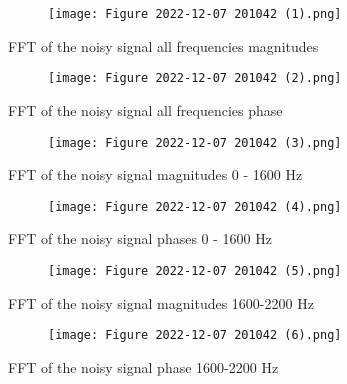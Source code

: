 \documentclass[12pt,a4paper]{article}
\begin{document}
\begin{figure}[h]
\centering
\begin{subfigure}{ 1\textwidth}
\texttt{[image: Figure 2022-12-07 201042 (1).png]}
\end{subfigure}
\caption{ FFT of the noisy signal all frequencies magnitudes }
\label{fig2:image22}
\end{figure}


\begin{figure}[h]
\centering
\begin{subfigure}{ 1\textwidth}
\texttt{[image: Figure 2022-12-07 201042 (2).png]}
\end{subfigure}
\caption{ FFT of the noisy signal all frequencies phase }
\label{fig2:image22}
\end{figure}

\begin{figure}[h]
\centering
\begin{subfigure}{ 1\textwidth}
\texttt{[image: Figure 2022-12-07 201042 (3).png]}
\end{subfigure}
\caption{ FFT of the noisy signal magnitudes 0 - 1600 Hz  }
\label{fig2:image22}
\end{figure}

\begin{figure}[h]
\centering
\begin{subfigure}{ 1\textwidth}
\texttt{[image: Figure 2022-12-07 201042 (4).png]}
\end{subfigure}
\caption{ FFT of the noisy signal phases 0 - 1600 Hz  }
\label{fig2:image22}
\end{figure}

\begin{figure}[h]
\centering
\begin{subfigure}{ 1\textwidth}
\texttt{[image: Figure 2022-12-07 201042 (5).png]}
\end{subfigure}
\caption{ FFT of the noisy signal magnitudes 1600-2200 Hz  }
\label{fig2:image22}
\end{figure}

\begin{figure}[h]
\centering
\begin{subfigure}{ 1\textwidth}
\texttt{[image: Figure 2022-12-07 201042 (6).png]}
\end{subfigure}
\caption{ FFT of the noisy signal phase 1600-2200 Hz  }
\label{fig2:image22}
\end{figure}
\end{document}

